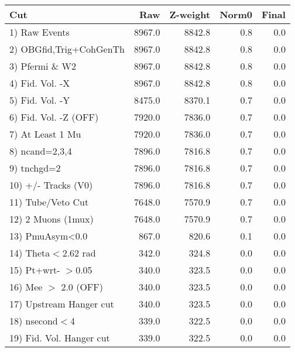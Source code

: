  \begin{table}[h!]\centering
 \begin{tabular}{||l||r|r|r|r||}
 \hline
 \hline
 Cut & Raw & Z-weight & Norm0 & Final \\
 \hline
  1) Raw Events           &      8967.0 &      8842.8 &         0.8 &         0.0 \\
  2) OBGfid,Trig+CohGenTh &      8967.0 &      8842.8 &         0.8 &         0.0 \\
  3) Pfermi \& W2         &      8967.0 &      8842.8 &         0.8 &         0.0 \\
  4) Fid. Vol. -X         &      8967.0 &      8842.8 &         0.8 &         0.0 \\
  5) Fid. Vol. -Y         &      8475.0 &      8370.1 &         0.7 &         0.0 \\
  6) Fid. Vol. -Z (OFF)   &      7920.0 &      7836.0 &         0.7 &         0.0 \\
  7) At Least 1 Mu        &      7920.0 &      7836.0 &         0.7 &         0.0 \\
  8) ncand=2,3,4          &      7896.0 &      7816.8 &         0.7 &         0.0 \\
  9) tnchgd=2             &      7896.0 &      7816.8 &         0.7 &         0.0 \\
 10) +/- Tracks (V0)      &      7896.0 &      7816.8 &         0.7 &         0.0 \\
 11) Tube/Veto Cut        &      7648.0 &      7570.9 &         0.7 &         0.0 \\
 12) 2 Muons (1mux)       &      7648.0 &      7570.9 &         0.7 &         0.0 \\
 13) PmuAsym<0.0          &       867.0 &       820.6 &         0.1 &         0.0 \\
 14) Theta$<$2.62 rad     &       342.0 &       324.8 &         0.0 &         0.0 \\
 15) Pt+wrt- $>$0.05      &       340.0 &       323.5 &         0.0 &         0.0 \\
 16) Mee $>$ 2.0  (OFF)   &       340.0 &       323.5 &         0.0 &         0.0 \\
 17) Upstream Hanger cut  &       340.0 &       323.5 &         0.0 &         0.0 \\
 18) nsecond$<$4          &       339.0 &       322.5 &         0.0 &         0.0 \\
 19) Fid. Vol. Hanger cut &       339.0 &       322.5 &         0.0 &         0.0 \\

\end{tabular}
\end{table}
